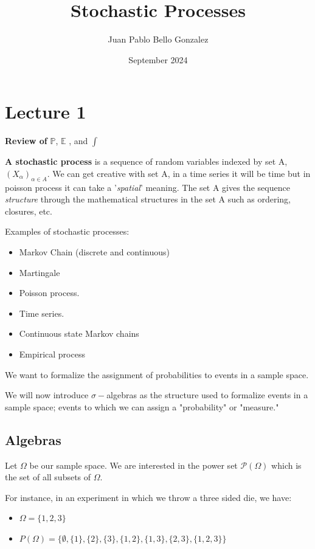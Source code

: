 \documentclass{article}
\title{Stochastic Processes}
\author{Juan Pablo Bello Gonzalez}
\date{September 2024}
\begin{document}
\maketitle


\section{Lecture 1}
\textbf{Review of } $\mathbb{P}$, $\mathbb{E}$
, and $\int$

\textbf{A stochastic process} is a sequence of random variables indexed by set A, $(X_{\alpha})_{\alpha \in A}$. We can get creative with set A, in a time series it will be time but in poisson process it can take a '\textit{spatial}' meaning. The set A gives the sequence \textit{structure} through the mathematical structures in the set A such as ordering, closures, etc. 

Examples of stochastic processes: 
\begin{itemize}
\item Markov Chain (discrete and continuous)
\item Martingale 
\item Poisson process.
\item Time series. 
\item Continuous state Markov chains 
\item Empirical process
\end{itemize}


We want to formalize the assignment of probabilities to events in a sample space. 


We will now introduce $\sigma-$algebras as the  structure used to formalize events in a sample space; events to which we can assign a "probability" or "measure."

\subsection{Algebras}
Let $\Omega$ be our sample space. We are interested in the power set $\mathcal{P}(\Omega)$ which is the set of all subsets of $\Omega$. 

For instance, in an experiment in which we throw a three sided die, we have:
\begin{itemize}
\item $\Omega = \{1,2,3\}$
\item $P(\Omega) = \{ \emptyset, \{1\}, \{2\}, \{3\}, \{ 1,2 \}, \{ 1, 3\}, \{2,3\}, \{1,2,3\}  \}$
\end{itemize}
\end{document}
